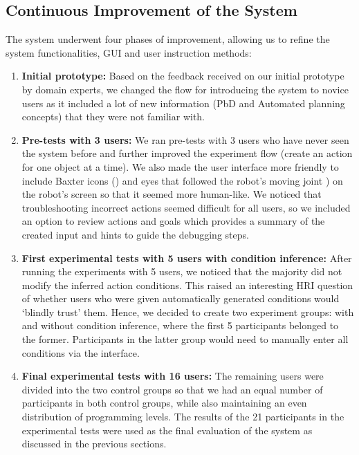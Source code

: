 \subsection{Continuous Improvement of the System}
The system underwent four phases of improvement, allowing us to refine the system functionalities, GUI and user instruction methods:
\begin{enumerate}
	\item {\textbf{Initial prototype:}
		Based on the feedback received on our initial prototype by domain experts, %
		we changed the flow for introducing the system to novice users as it included a lot of new information (\eg PbD and Automated planning concepts) that they were not familiar with.
	}
	\item {\textbf{Pre-tests with 3 users:}
		We ran pre-tests with 3 users who have never seen the system before and further improved the experiment flow (\eg create an action for one object at a time).
		We also made the user interface more friendly to include Baxter icons () and eyes that followed the robot's moving joint \cite{baxtereyes}) on the robot's screen so that it seemed more human-like.
		We noticed that troubleshooting incorrect actions seemed difficult for all users, so we included an option to review actions and goals which provides a summary of the created input and hints to guide the debugging steps.}
	\item {\textbf{First experimental tests with 5 users with condition inference:}
		After running the experiments with 5 users, we noticed that the majority did not modify the inferred action conditions.
		This raised an interesting HRI question of whether users who were given automatically generated conditions would `blindly trust' them.
		Hence, we decided to create two experiment groups: with and without condition inference, where the first 5 participants belonged to the former.
		Participants in the latter group would need to manually enter all conditions via the interface. }
	\item {\textbf{Final experimental tests with 16 users:}
		The remaining users were divided into the two control groups so that we had an equal number of participants in both control groups, while also maintaining an even distribution of programming levels.
		The results of the 21 participants in the experimental tests were used as the final evaluation of the system as discussed in the previous sections.
	}
\end{enumerate}

